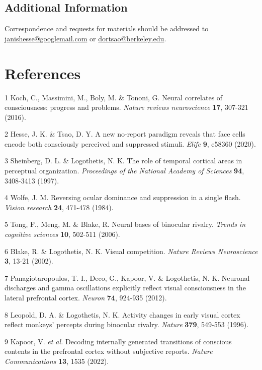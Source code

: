 \documentclass{article}
\begin{document}
\subsection*{Additional Information}

Correspondence and requests for materials should be addressed to \href{mailto:janishesse@googlemail.com}{janishesse@googlemail.com} or \href{mailto:dortsao@berkeley.edu}{dortsao@berkeley.edu}.

\section*{References}

\begin{hangpars}
1 Koch, C., Massimini, M., Boly, M. \& Tononi, G. Neural correlates of consciousness: progress and problems. \textit{Nature reviews neuroscience} \textbf{17}, 307-321 (2016).

2 Hesse, J. K. \& Tsao, D. Y. A new no-report paradigm reveals that face cells encode both consciously perceived and suppressed stimuli. \textit{Elife} \textbf{9}, e58360 (2020).

3 Sheinberg, D. L. \& Logothetis, N. K. The role of temporal cortical areas in perceptual organization. \textit{Proceedings of the National Academy of Sciences} \textbf{94}, 3408-3413 (1997).

4 Wolfe, J. M. Reversing ocular dominance and suppression in a single flash. \textit{Vision research} \textbf{24}, 471-478 (1984).

5 Tong, F., Meng, M. \& Blake, R. Neural bases of binocular rivalry. \textit{Trends in cognitive sciences} \textbf{10}, 502-511 (2006).

6 Blake, R. \& Logothetis, N. K. Visual competition. \textit{Nature Reviews Neuroscience} \textbf{3}, 13-21 (2002).

7 Panagiotaropoulos, T. I., Deco, G., Kapoor, V. \& Logothetis, N. K. Neuronal discharges and gamma oscillations explicitly reflect visual consciousness in the lateral prefrontal cortex. \textit{Neuron} \textbf{74}, 924-935 (2012).

8 Leopold, D. A. \& Logothetis, N. K. Activity changes in early visual cortex reflect monkeys' percepts during binocular rivalry. \textit{Nature} \textbf{379}, 549-553 (1996).

9 Kapoor, V. \textit{et al.} Decoding internally generated transitions of conscious contents in the prefrontal cortex without subjective reports. \textit{Nature Communications} \textbf{13}, 1535 (2022).


\end{hangpars}
\end{document}
